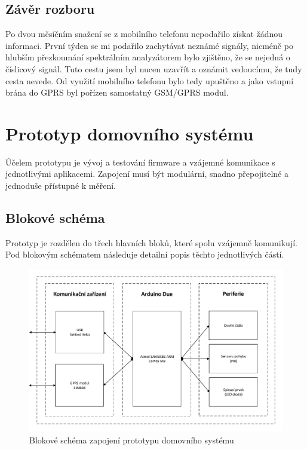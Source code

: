 \documentclass[FM,DP]{tulthesis}  %
\begin{document}
\subsection{Závěr rozboru}
Po dvou měsíčním snažení se z mobilního telefonu nepodařilo získat žádnou informaci. První týden se mi podařilo zachytávat neznámé signály, nicméně po hlubším přezkoumání spektrálním analyzátorem bylo zjištěno, že se nejedná o číslicový signál. Tuto cestu jsem byl nucen uzavřít a oznámit vedoucímu, že tudy cesta nevede. Od využití mobilního telefonu bylo tedy upuštěno a jako vstupní brána do GPRS byl pořízen samostatný GSM/GPRS modul.

\section{Prototyp domovního systému}
Účelem prototypu je vývoj a testování firmware a vzájemné komunikace s jednotlivými aplikacemi. Zapojení musí být modulární, snadno přepojitelné a jednoduše přístupné k měření.

\subsection{Blokové schéma}
Prototyp je rozdělen do třech hlavních bloků, které spolu vzájemně komunikují. Pod blokovým schématem následuje detailní popis těchto jednotlivých částí.

\begin{figure}[H]
\begin{center}
\includegraphics[width=\textwidth]{vector/blokoveSchemaHardware.pdf}
\caption{Blokové schéma zapojení prototypu domovního systému}
\label{image}
\end{center}
\end{figure}
\end{document}
